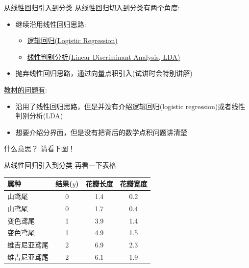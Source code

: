 \documentclass[handout]{ctexbeamer}
\begin{document}
\begin{frame}{从线性回归引入到分类}
	从线性回归切入到分类有两个角度:
	\setlength\itemsep{0.6em}
	\begin{itemize}
		\item 继续沿用线性回归思路: 
		\begin{itemize}
		\setlength\itemsep{0.3em}
		\item \underline{逻辑回归(Logistic Regression)}
		\item \underline{线性判别分析(Linear Discriminant Analysis, LDA)}
		\end{itemize}
		\item 抛弃线性回归思路，通过向量点积引入(试讲时会特别讲解)
	\end{itemize}
	
	\underline{教材的问题有}:
	\begin{itemize}
		\item 沿用了线性回归思路，但是并没有介绍逻辑回归(logistic regression)或者线性判别分析(LDA)
		\item 想要介绍分界面，但是没有把背后的数学点积问题讲清楚
	\end{itemize}
	
	\hfil
	
	什么意思？ 请看下图！
\end{frame}

\begin{frame}{从线性回归引入到分类}
再看一下表格
		\begin{table}[H]
		\centering
		\begin{tabular}{lccc}
		\hline 
			属种 & 结果($y$) &花瓣长度 & 花瓣宽度 \\
			\hline 
			山鸢尾 & 0 & 1.4 & 0.2 \\
			山鸢尾 & 0 & 1.7 & 0.4 \\
			变色鸢尾 & 1 & 3.9  & 1.4 \\
			变色鸢尾 & 1& 4.9 & 1.5 \\
			维吉尼亚鸢尾 & 2 & 6.9 & 2.3  \\
			维吉尼亚鸢尾 & 2 & 6.1 & 1.9 \\
			\hline  
		\end{tabular}
\end{table}	
\end{frame}
\end{document}
